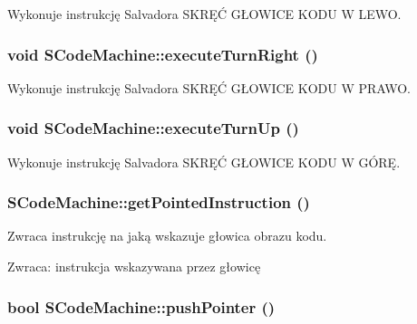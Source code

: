 Wykonuje instrukcję Salvadora SKRĘĆ GŁOWICE KODU W LEWO. \hypertarget{classSCodeMachine_d48065e7bf42eef9e3a0f81fbb17f301}{
\subsubsection[{executeTurnRight}]{\setlength{\rightskip}{0pt plus 5cm}void SCodeMachine::executeTurnRight ()}}
\label{classSCodeMachine_d48065e7bf42eef9e3a0f81fbb17f301}


Wykonuje instrukcję Salvadora SKRĘĆ GŁOWICE KODU W PRAWO. \hypertarget{classSCodeMachine_f2867d02414db096844e4801f9895650}{
\subsubsection[{executeTurnUp}]{\setlength{\rightskip}{0pt plus 5cm}void SCodeMachine::executeTurnUp ()}}
\label{classSCodeMachine_f2867d02414db096844e4801f9895650}


Wykonuje instrukcję Salvadora SKRĘĆ GŁOWICE KODU W GÓRĘ. \hypertarget{classSCodeMachine_3c851e80ec35cbebeb78ec8ceed8c5ca}{
\subsubsection[{getPointedInstruction}]{ SCodeMachine::getPointedInstruction ()}}
\label{classSCodeMachine_3c851e80ec35cbebeb78ec8ceed8c5ca}


Zwraca instrukcję na jaką wskazuje głowica obrazu kodu. \begin{Desc}
\item[Zwraca:]instrukcja wskazywana przez głowicę \end{Desc}
\hypertarget{classSCodeMachine_69a97f71f2a16f69f9daca1bf8433964}{
\subsubsection[{pushPointer}]{\setlength{\rightskip}{0pt plus 5cm}bool SCodeMachine::pushPointer ()}}
\label{classSCodeMachine_69a97f71f2a16f69f9daca1bf8433964}


